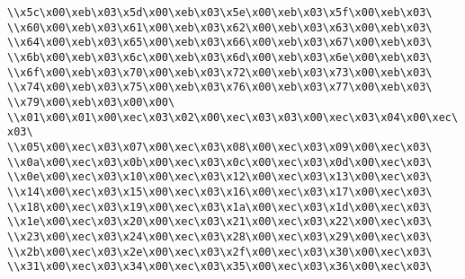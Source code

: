 \verb|\\x5c\x00\xeb\x03\x5d\x00\xeb\x03\x5e\x00\xeb\x03\x5f\x00\xeb\x03\|\newline
\verb|\\x60\x00\xeb\x03\x61\x00\xeb\x03\x62\x00\xeb\x03\x63\x00\xeb\x03\|\newline
\verb|\\x64\x00\xeb\x03\x65\x00\xeb\x03\x66\x00\xeb\x03\x67\x00\xeb\x03\|\newline
\verb|\\x6b\x00\xeb\x03\x6c\x00\xeb\x03\x6d\x00\xeb\x03\x6e\x00\xeb\x03\|\newline
\verb|\\x6f\x00\xeb\x03\x70\x00\xeb\x03\x72\x00\xeb\x03\x73\x00\xeb\x03\|\newline
\verb|\\x74\x00\xeb\x03\x75\x00\xeb\x03\x76\x00\xeb\x03\x77\x00\xeb\x03\|\newline
\verb|\\x79\x00\xeb\x03\x00\x00\|\newline
\verb|\\x01\x00\x01\x00\xec\x03\x02\x00\xec\x03\x03\x00\xec\x03\x04\x00\xec\x03\|\newline
\verb|\\x05\x00\xec\x03\x07\x00\xec\x03\x08\x00\xec\x03\x09\x00\xec\x03\|\newline
\verb|\\x0a\x00\xec\x03\x0b\x00\xec\x03\x0c\x00\xec\x03\x0d\x00\xec\x03\|\newline
\verb|\\x0e\x00\xec\x03\x10\x00\xec\x03\x12\x00\xec\x03\x13\x00\xec\x03\|\newline
\verb|\\x14\x00\xec\x03\x15\x00\xec\x03\x16\x00\xec\x03\x17\x00\xec\x03\|\newline
\verb|\\x18\x00\xec\x03\x19\x00\xec\x03\x1a\x00\xec\x03\x1d\x00\xec\x03\|\newline
\verb|\\x1e\x00\xec\x03\x20\x00\xec\x03\x21\x00\xec\x03\x22\x00\xec\x03\|\newline
\verb|\\x23\x00\xec\x03\x24\x00\xec\x03\x28\x00\xec\x03\x29\x00\xec\x03\|\newline
\verb|\\x2b\x00\xec\x03\x2e\x00\xec\x03\x2f\x00\xec\x03\x30\x00\xec\x03\|\newline
\verb|\\x31\x00\xec\x03\x34\x00\xec\x03\x35\x00\xec\x03\x36\x00\xec\x03\|\newline
